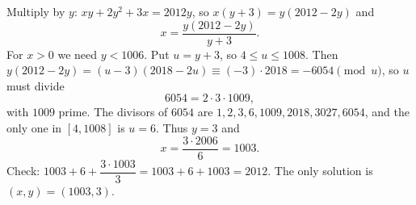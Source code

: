 Multiply by $y$: $xy+2y^2+3x=2012y$, so $x(y+3)=y(2012-2y)$ and
\[
x=\dfrac{y(2012-2y)}{y+3}.
\]
For $x>0$ we need $y<1006$. Put $u=y+3$, so $4\le u\le1008$. Then $y(2012-2y)=(u-3)(2018-2u)\equiv(-3)\cdot2018=-6054\pmod u$, so $u$ must divide
\[
6054=2\cdot3\cdot1009 ,
\]
with $1009$ prime. The divisors of $6054$ are $1,2,3,6,1009,2018,3027,6054$, and the only one in $[4,1008]$ is $u=6$. Thus $y=3$ and
\[
x=\dfrac{3\cdot2006}{6}=1003 .
\]
Check: $1003+6+\dfrac{3\cdot1003}{3}=1003+6+1003=2012$. The only solution is $\boxed{(x,y)=(1003,3)}$.

